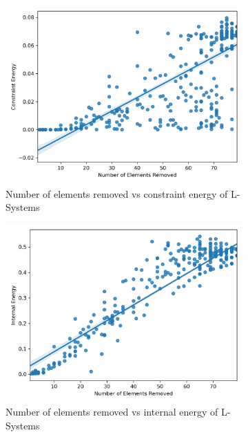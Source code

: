 \begin{figure}[H]
\begin{subfigure}[t]{0.45\textwidth}
		\includegraphics[width=\textwidth]{ne_ce_ls.png}
		\caption{Number of elements removed vs constraint energy of L-Systems}
	\end{subfigure}
	\hfill
	\begin{subfigure}[t]{0.45\textwidth}
		\centering
		\includegraphics[width=\textwidth]{ne_ie_ls.png}
		\caption{Number of elements removed vs internal energy of L-Systems}
	\end{subfigure}
	\hfill
	\begin{subfigure}[t]{0.45\textwidth}
		\centering

\end{subfigure}
\end{figure}
